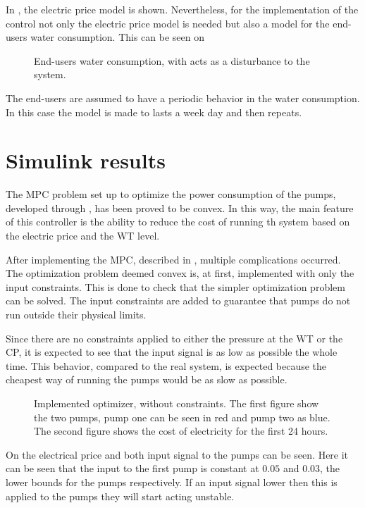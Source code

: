 In , the electric price model is shown. Nevertheless, for the implementation of the control not only the electric price model is needed but also a model for the end-users water consumption. This can be seen on 

\begin{figure}[H]
\centering
 
\caption{End-users water consumption, with acts as a disturbance to the system.}
\label{fig:water_consumption}
\end{figure}

The end-users are assumed to have a periodic behavior in the water consumption. In this case the model is made to lasts a week day and then repeats. 


\section{Simulink results}
The MPC problem set up to optimize the power consumption of the pumps, developed through , has been proved to be convex. In this way, the main feature of this controller is the ability to reduce the cost of running th system based on the electric price and the WT level. 

After implementing the MPC, described in , multiple complications occurred. The optimization problem deemed convex is, at first, implemented with only the input constraints. This is done to check that the simpler optimization problem can be solved. The input constraints are added to guarantee that pumps do not run outside their physical limits. 

Since there are no constraints applied to either the pressure at the WT or the CP, it is expected to see that the input signal is as low as possible the whole time. This behavior, compared to the real system, is expected because the cheapest way of running the pumps would be as slow as possible. 

\begin{figure}[H]
\centering
 
\caption{Implemented optimizer, without constraints. The first figure show the two pumps, pump one can be seen in red and pump two as blue. The second figure shows the cost of electricity for the first 24 hours.}
\label{fig:Implementation_shit}
\end{figure}

On  the electrical price and both input signal to the pumps can be seen. Here it can be seen that the input to the first pump is constant at $0.05$ and $0.03$, the lower bounds for the pumps respectively. If an input signal lower then this is applied to the pumps they will start acting unstable. 

